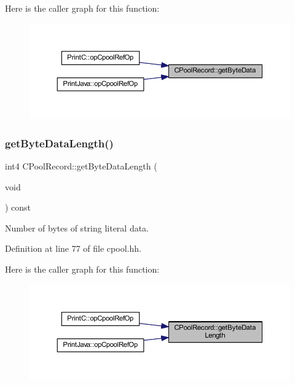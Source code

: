 Here is the caller graph for this function\+:
\nopagebreak
\begin{figure}[H]
\begin{center}
\leavevmode
\includegraphics[width=350pt]{class_c_pool_record_af0ba95f04fca02b928729e8fefe18096_icgraph}
\end{center}
\end{figure}
\mbox{\label{class_c_pool_record_a9f4149e7836173ae8658d6c5d820c13e}} 
\subsubsection{\texorpdfstring{getByteDataLength()}{getByteDataLength()}}
{\footnotesize\ttfamily int4 C\+Pool\+Record\+::get\+Byte\+Data\+Length (\begin{DoxyParamCaption}\item[{void}]{ }\end{DoxyParamCaption}) const\hspace{0.3cm}{\ttfamily [inline]}}



Number of bytes of string literal data. 



Definition at line 77 of file cpool.\+hh.

Here is the caller graph for this function\+:
\nopagebreak
\begin{figure}[H]
\begin{center}
\leavevmode
\includegraphics[width=350pt]{class_c_pool_record_a9f4149e7836173ae8658d6c5d820c13e_icgraph}
\end{center}
\end{figure}
\mbox{\label{class_c_pool_record_ad446b1f55deb567ad7e9671512dc1c94}} 
